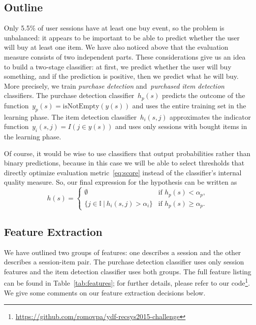 \documentclass{sig-alternate}
\begin{document}
\subsection{Outline}
Only 5.5\% of user sessions have at least one buy event,
so the problem is unbalanced: it appears to be important to be able
to predict whether the user will buy at least one item.
We have also noticed above that the evaluation measure consists of
two independent parts.
These considerations give us an idea to build a two-stage classifier:
at first, we predict whether the user will buy something,
and if the prediction is positive, then we predict what he will buy.
More precisely, we train \emph{purchase detection} and~\emph{purchased item detection} classifiers.
The purchase detection classifier~$h_p(s)$ predicts the outcome of the
function~$y_p(s) = \text{isNotEmpty}(y(s))$ and uses the entire training set in the
learning phase.
The item detection classifier~$h_i(s, j)$ approximates the
indicator function~$y_i(s, j) = I(j \in y(s))$ and uses only sessions with bought items
in the learning phase.

Of course, it would be wise to use classifiers that output probabilities rather
than binary predictions, because in this case we will be able to select thresholds that
directly optimize evaluation metric~\eqref{eq:score} instead of
the classifier's internal quality measure.
So, our final expression for the hypothesis can be written as
\begin{equation}
\label{eq:classifier}
    h(s)
    =
    \begin{cases}
        \emptyset & \mbox{if } h_p(s) < \alpha_p,\\
        \{j \in \mathbb{I}\ |\ h_i(s, j) > \alpha_i\} & \mbox{if } h_p(s) \geq \alpha_p.
    \end{cases}
\end{equation}

\subsection{Feature Extraction}
We have outlined two groups of features: one describes a session
and the other describes a session-item pair.
The purchase detection classifier uses only session features
and the item detection classifier uses both groups.
The full feature listing can be found in Table~\ref{tab:features};
for further details, please refer
to our code\footnote{\small{\url{https://github.com/romovpa/ydf-recsys2015-challenge}}}.
We give some comments on our feature extraction decisions below.
\end{document}
